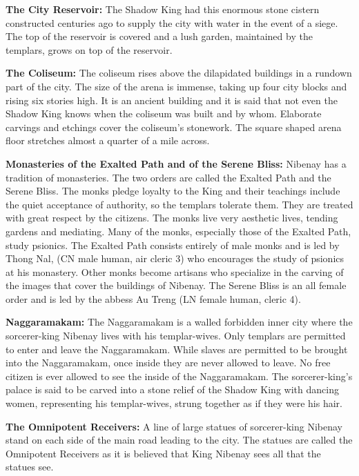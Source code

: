 {
	\textbf{The City Reservoir:} The Shadow King had this enormous stone cistern constructed centuries ago to supply the city with water in the event of a siege. The top of the reservoir is covered and a lush garden, maintained by the templars, grows on top of the reservoir.

	\textbf{The Coliseum:} The coliseum rises above the dilapidated buildings in a rundown part of the city. The size of the arena is immense, taking up four city blocks and rising six stories high. It is an ancient building and it is said that not even the Shadow King knows when the coliseum was built and by whom. Elaborate carvings and etchings cover the coliseum's stonework. The square shaped arena floor stretches almost a quarter of a mile across.

	\textbf{Monasteries of the Exalted Path and of the Serene Bliss:} Nibenay has a tradition of monasteries. The two orders are called the Exalted Path and the Serene Bliss. The monks pledge loyalty to the King and their teachings include the quiet acceptance of authority, so the templars tolerate them. They are treated with great respect by the citizens. The monks live very aesthetic lives, tending gardens and mediating. Many of the monks, especially those of the Exalted Path, study psionics. The Exalted Path consists entirely of male monks and is led by Thong Nal, (CN male human, air cleric 3) who encourages the study of psionics at his monastery. Other monks become artisans who specialize in the carving of the images that cover the buildings of Nibenay. The Serene Bliss is an all female order and is led by the abbess Au Treng (LN female human, cleric 4).

	\textbf{Naggaramakam:} The Naggaramakam is a walled forbidden inner city where the sorcerer-king Nibenay lives with his templar-wives. Only templars are permitted to enter and leave the Naggaramakam. While slaves are permitted to be brought into the Naggaramakam, once inside they are never allowed to leave. No free citizen is ever allowed to see the inside of the Naggaramakam. The sorcerer-king's palace is said to be carved into a stone relief of the Shadow King with dancing women, representing his templar-wives, strung together as if they were his hair.

	\textbf{The Omnipotent Receivers:} A line of large statues of sorcerer-king Nibenay stand on each side of the main road leading to the city. The statues are called the Omnipotent Receivers as it is believed that King Nibenay sees all that the statues see.

}

